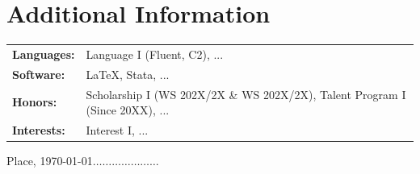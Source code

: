 \documentclass[10pt,letterpaper]{article}						%
\begin{document}

\section{Additional Information}
\hspace{-0.2cm}\begin{tabularx}{18.4cm}{lX}						%

\textbf{Languages:}
& Language I (Fluent, C2),  ...\\

\textbf{Software:}
& \LaTeX, Stata,  ... \\

\textbf{Honors:}
& Scholarship I (WS 202X/2X \& WS 202X/2X),  Talent Program I (Since 20XX),  ...\\

\textbf{Interests:}
& Interest I,  ...

\end{tabularx}


\vfill
\noindent
\hfill {\footnotesize Place,  \today $\ldots\ldots\ldots\ldots\ldots\ldots\ldots$}	%
\end{document}
